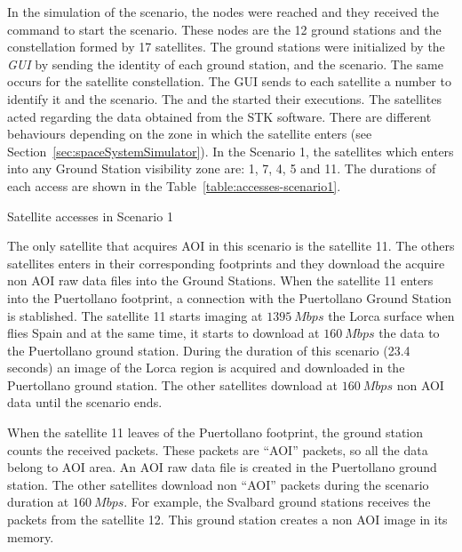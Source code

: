 In the simulation of the scenario, the \vw nodes were reached and they received
the command to start the scenario. These nodes are the 12 ground stations and
the constellation formed by 17 satellites. The ground stations were initialized by
the \emph{GUI} by sending the identity of each ground station, and
the scenario. 
The same occurs for the satellite constellation. The \ac{GUI} sends to each
satellite a number to identify it and the scenario.
 The \satss and the \gsss started their executions. The satellites acted regarding the data obtained from the \ac{STK} software. 
There are different behaviours depending on the zone in which the satellite enters (see
Section~\ref{sec:spaceSystemSimulator}). In the Scenario 1, the satellites which
enters into any Ground Station visibility zone are: 1, 7, 4, 5 and 11. The
durations of each access are shown in the Table~\ref{table:accesses-scenario1}.
\begin{table}[!h]
  \centering
  {\small
  
  }
  \caption{Satellite accesses in Scenario 1}
  \label{table:accesses-scenario1}
\end{table}

The only satellite that acquires \ac{AOI} in this scenario is the satellite
11. The others satellites enters in their corresponding footprints and they
download the acquire non \ac{AOI} raw data files into the Ground Stations. When the satellite 11 enters into the Puertollano footprint, a connection with
the Puertollano Ground Station is stablished. The satellite
11 starts imaging at $1395~Mbps$ the Lorca surface when flies Spain and at the same time, it
starts to download at $160~Mbps$ the data to the Puertollano ground station. During the
duration of this scenario (23.4 seconds) an image of the Lorca region is
acquired and downloaded in the Puertollano ground station. The other satellites
download at $160~Mbps$ non \ac{AOI} data until the scenario ends. 

When the satellite 11 leaves of the Puertollano footprint, the ground station
counts the received packets. These packets are ``AOI'' packets, so all the data
belong to \ac{AOI} area. An \ac{AOI} raw data file is created in the
Puertollano ground station. 
The other satellites download non ``AOI'' packets during the scenario duration
at $160~Mbps$. For example, the Svalbard ground stations receives the packets
from the satellite 12. This ground station creates a non \ac{AOI} image in its
memory.

